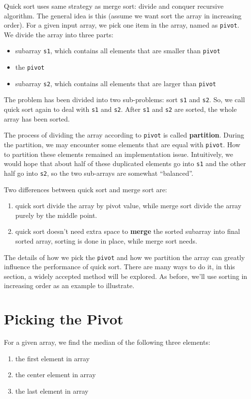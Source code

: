 \documentclass[11pt]{book}
\begin{document}
Quick sort uses same strategy as merge sort: divide and conquer recursive algorithm. The general idea is this (assume we want sort the array in increasing order). For a given input array, we pick one item in the array, named as \texttt{pivot}. We divide the array into three parts:
\begin{itemize}
\item subarray \texttt{s1}, which contains all elements that are smaller than \texttt{pivot}
\item the \texttt{pivot}
\item subarray \texttt{s2}, which contains all elements that are larger than \texttt{pivot}
\end{itemize}
The problem has been divided into two sub-problems: sort \texttt{s1} and \texttt{s2}. So, we call quick sort again to deal with \texttt{s1} and \texttt{s2}. After \texttt{s1} and \texttt{s2} are sorted, the whole array has been sorted.

The process of dividing the array according to \texttt{pivot} is called \textbf{partition}. During the partition, we may encounter some elements that are equal with \texttt{pivot}. How to partition these elements remained an implementation issue. Intuitively, we would hope that about half of these duplicated elements go into \texttt{s1} and the other half go into \texttt{s2}, so the two sub-arrays are somewhat ``balanced''.

Two differences between quick sort and merge sort are:
\begin{enumerate}
\item quick sort divide the array by pivot value, while merge sort divide the array purely by the middle point.
\item quick sort doesn't need extra space to \textbf{merge} the sorted subarray into final sorted array, sorting is done in place, while merge sort needs.
\end{enumerate}

The details of how we pick the \texttt{pivot} and how we partition the array can greatly influence the performance of quick sort. There are many ways to do it, in this section, a widely accepted method will be explored. As before, we'll use sorting in increasing order as an example to illustrate.
\section{Picking the Pivot}
\label{sec:org6801e69}
For a given array, we find the median of the following three elements:
\begin{enumerate}
\item the first element in array
\item the center element in array
\item the last element in array
\end{enumerate}
\end{document}
